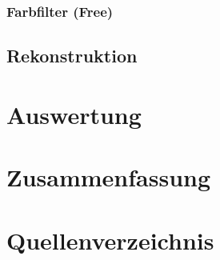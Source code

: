 \documentclass[ngerman,a4paper]{scrartcl}
\begin{document}
\subsubsection{Farbfilter (Free)}

\subsection{Rekonstruktion}


\section{Auswertung}


\section{Zusammenfassung}


\section{Quellenverzeichnis}

\end{document}
